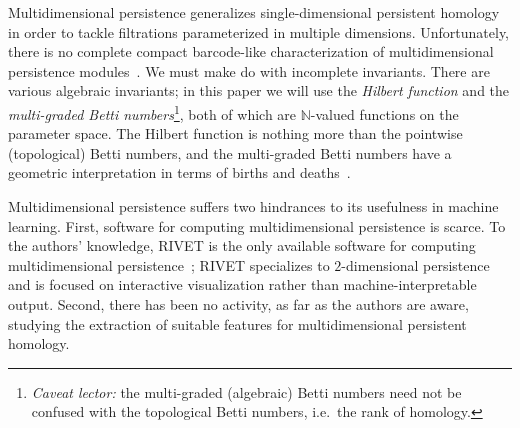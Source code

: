 \documentclass{article}
\begin{document}
Multidimensional persistence generalizes single-dimensional persistent homology
in order to tackle filtrations parameterized in multiple dimensions.
Unfortunately, there is no complete
compact barcode-like characterization of multidimensional persistence
modules~\cite{carlsson_theory_2009}. We must make do with incomplete invariants.
There are various algebraic invariants; in this paper we will use the
\textit{Hilbert function} and the \textit{multi-graded Betti numbers}\footnote{\textit{Caveat lector:} the multi-graded (algebraic) Betti numbers need not be confused with the topological Betti numbers, i.e.~the rank of homology.}, both of
which are $\mathbb{N}$-valued functions on the parameter space.
The Hilbert function is nothing more than the pointwise
(topological) Betti numbers, and the multi-graded Betti
numbers have a geometric interpretation in terms of births and deaths~\cite{knudson_refinement_2008}.


Multidimensional persistence suffers two hindrances to its usefulness in
machine learning. First, software for computing multidimensional persistence is
scarce. To the authors' knowledge, RIVET is the only available software for
computing multidimensional persistence~\cite{lesnick_interactive_2015}; RIVET
specializes to $2$-dimensional persistence and is focused on interactive
visualization rather than machine-interpretable output.
Second, %
there has been no activity, as far as the authors are aware, studying the extraction
of suitable features for multidimensional persistent homology.
\end{document}
